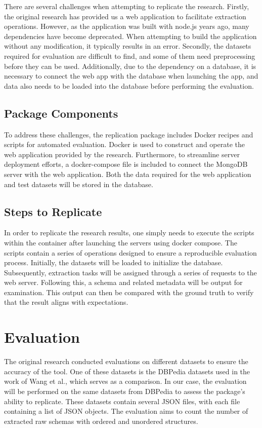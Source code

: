 \documentclass[sigconf, nonacm]{acmart}
\begin{document}
There are several challenges when attempting to replicate the research. Firstly, the original research has provided us a web application to facilitate extraction operations. However, as the application was built with node.js years ago, many dependencies have become deprecated. When attempting to build the application without any modification, it typically results in an error. Secondly, the datasets required for evaluation are difficult to find, and some of them need preprocessing before they can be used. Additionally, due to the dependency on a database, it is necessary to connect the web app with the database when launching the app, and data also needs to be loaded into the database before performing the evaluation.

\subsection{Package Components}

To address these challenges, the replication package includes Docker recipes and scripts for automated evaluation. Docker is used to construct and operate the web application provided by the research. Furthermore, to streamline server deployment efforts, a docker-compose file is included to connect the MongoDB server with the web application. Both the data required for the web application and test datasets will be stored in the database.

\subsection{Steps to Replicate}

In order to replicate the research results, one simply needs to execute the scripts within the container after launching the servers using docker compose. The scripts contain a series of operations designed to ensure a reproducible evaluation process. Initially, the datasets will be loaded to initialize the database. Subsequently, extraction tasks will be assigned through a series of requests to the web server. Following this, a schema and related metadata will be output for examination. This output can then be compared with the ground truth to verify that the result aligns with expectations.

\section{Evaluation}

The original research conducted evaluations on different datasets to ensure the accuracy of the tool. One of these datasets is the DBPedia datasets used in the work of Wang et al.\cite{schemamanagement}, which serves as a comparison. In our case, the evaluation will be performed on the same datasets from DBPedia to assess the package’s ability to replicate. These datasets contain several JSON files, with each file containing a list of JSON objects. The evaluation aims to count the number of extracted raw schemas with ordered and unordered structures.
\end{document}
